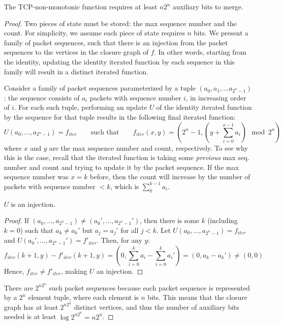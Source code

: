 \begin{theorem}
The TCP-non-monotonic function requires at least $n2^n$ auxiliary bits to merge.
\end{theorem}
\begin{proof}
Two pieces of state must be stored: the max sequence number and the count. For
simplicity, we assume each piece of state requires $n$ bits.
We present a family of packet sequences, such that there is an injection from the packet
 sequences to the vertices in the closure graph of $f$. In other words, starting from the identity, updating the identity iterated function by each sequence in this family will result in a distinct iterated function. 

Consider a family of packet sequences parameterized by a tuple $(a_0, a_1, \ldots a_{2^n-1})$: the sequence consists of $a_i$ packets with sequence number $i$, in increasing order of $i$. For each such tuple, performing an update $U$ of the identity iterated function by the sequence for that tuple results in the following final iterated function:
\[ U(a_0, \ldots, a_{2^n-1}) = f_{iter}\quad\quad \text{such that} \quad\quad f_{iter}(x,y) = \left(2^n - 1, (y + \sum_{i=0}^{x-1} a_i) \mod 2^n\right) \]
where $x$ and $y$ are the max sequence number and count, respectively. To see why this is the case, recall that the iterated function is taking some \emph{previous} max seq. number and count and trying to update it by the packet sequence. If the max sequence number was $x = k$ before, then the count will increase by the number of packets with sequence number $< k$, which is $\sum_0^{k-1} a_i$.
\begin{lemma}
$U$ is an injection.
\end{lemma}
\begin{proof}
If $(a_0, \ldots, a_{2^n-1}) \neq (a_0', \ldots, a_{2^n-1}')$, then there is
some $k$ (including $k=0$) such that $a_k \neq a_k'$ but $a_j = a_j'$ for all
$j < k$. Let $U(a_0, \ldots, a_{2^n-1}) = f_{iter}$ and $U(a_0', \ldots, a_{2^n-1}') =
f'_{iter}$. Then, for any $y$: \[ f_{iter}(k+1, y) - f'_{iter}(k+1,y) = \left(0, \sum_{i = 0}^k a_i
- \sum_{i = 0}^k a_i'\right) = (0, a_k - a_k') \neq (0, 0) \] Hence, $f_{iter} \neq f'_{iter}$,
making $U$ an injection.
\end{proof}
There are $2^{n2^n}$ such packet sequences because each packet sequence is
represented by a $2^n$ element tuple, where each element is $n$ bits. This
means that the closure graph has at least $2^{n2^n}$ distinct vertices, and
thus the number of auxiliary bits needed is at least $\log 2^{n2^n} = n2^n$. 
\end{proof}

